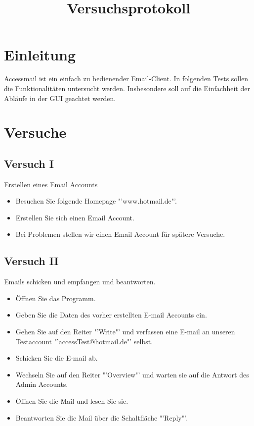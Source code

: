 \documentclass[10pt,a4paper]{article}
\title{Versuchsprotokoll}
\begin{document}
\maketitle
\section*{Einleitung}
Accessmail ist ein einfach zu bedienender Email-Client. In folgenden Tests 
sollen die Funktionalitäten untersucht werden. Insbesondere 
soll auf die Einfachheit der Abläufe in der GUI geachtet werden.
\section*{Versuche}
\subsection*{Versuch I}
Erstellen eines Email Accounts
\begin{itemize}
	\item Besuchen Sie folgende Homepage "'www.hotmail.de"'.
	\item Erstellen Sie sich einen Email Account.
	\item Bei Problemen stellen wir einen Email Account für spätere Versuche.
\end{itemize}
\subsection*{Versuch II}
Emails schicken und empfangen und beantworten.
\begin{itemize}
	\item Öffnen Sie das Programm.
	\item Geben Sie die Daten des vorher erstellten E-mail Accounts ein.
	\item Gehen Sie auf den Reiter "'Write"' und verfassen eine E-mail an unseren Testaccount "'accessTest@hotmail.de"' selbst. 
	\item Schicken Sie die E-mail ab.
	\item Wechseln Sie auf den Reiter "'Overview"' und warten sie auf die Antwort des Admin Accounts.
	\item Öffnen Sie die Mail und lesen Sie sie.
	\item Beantworten Sie die Mail über die Schaltfläche "'Reply"'.	
\end{itemize}
\end{document}

